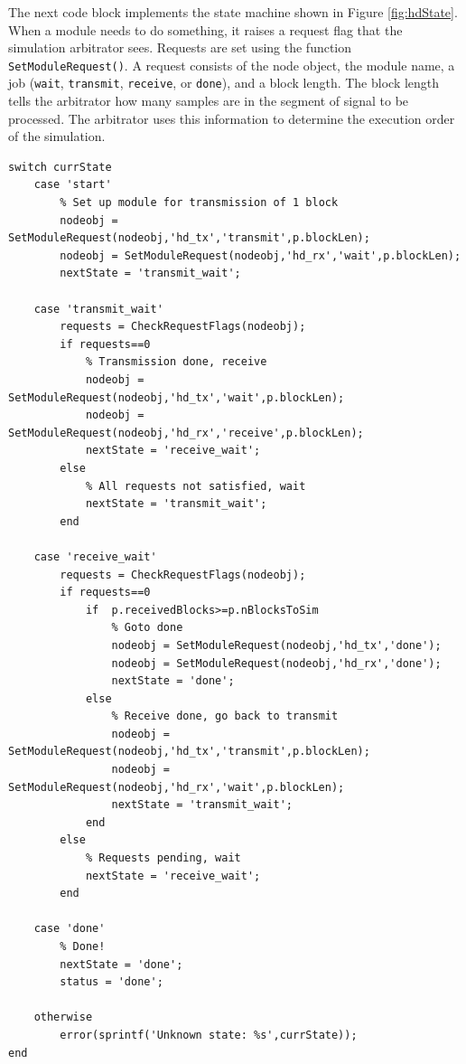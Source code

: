 The next code block implements the state machine shown in Figure
\ref{fig:hdState}.  When a module needs to do something, it raises a
request flag that the simulation arbitrator sees.  Requests are set
using the function \verb+SetModuleRequest()+.  A request consists of
the node object, the module name, a job (\verb+wait+,
\verb+transmit+, \verb+receive+, or \verb+done+), and a block
length. The block length tells the arbitrator how many samples are
in the segment of signal to be processed.  The arbitrator uses this
information to determine the execution order of the simulation.

\begin{lstlisting}[name=hdState]
% State machine next-state and output "logic"
switch currState
    case 'start'
        % Set up module for transmission of 1 block
        nodeobj = SetModuleRequest(nodeobj,'hd_tx','transmit',p.blockLen);
        nodeobj = SetModuleRequest(nodeobj,'hd_rx','wait',p.blockLen);
        nextState = 'transmit_wait';
        
    case 'transmit_wait'
        requests = CheckRequestFlags(nodeobj);
        if requests==0
            % Transmission done, receive
            nodeobj = SetModuleRequest(nodeobj,'hd_tx','wait',p.blockLen);
            nodeobj = SetModuleRequest(nodeobj,'hd_rx','receive',p.blockLen);
            nextState = 'receive_wait';
        else
            % All requests not satisfied, wait
            nextState = 'transmit_wait';
        end

    case 'receive_wait'
        requests = CheckRequestFlags(nodeobj);
        if requests==0 
            if  p.receivedBlocks>=p.nBlocksToSim
                % Goto done
                nodeobj = SetModuleRequest(nodeobj,'hd_tx','done');
                nodeobj = SetModuleRequest(nodeobj,'hd_rx','done');
                nextState = 'done';
            else
                % Receive done, go back to transmit
                nodeobj = SetModuleRequest(nodeobj,'hd_tx','transmit',p.blockLen);
                nodeobj = SetModuleRequest(nodeobj,'hd_rx','wait',p.blockLen);
                nextState = 'transmit_wait';
            end
        else
            % Requests pending, wait
            nextState = 'receive_wait';
        end
        
    case 'done'
        % Done!
        nextState = 'done';
        status = 'done';
                
    otherwise
        error(sprintf('Unknown state: %s',currState));
end

\end{lstlisting}

